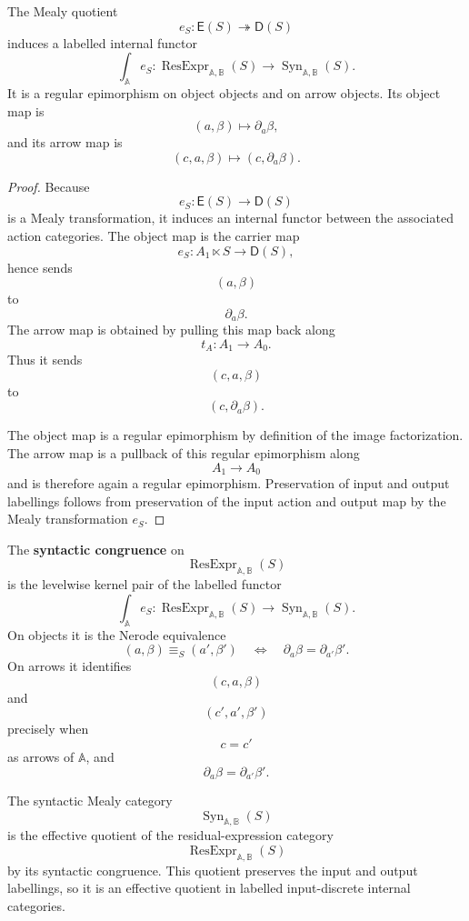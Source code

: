 \begin{proposition}
\label{prop:residual-expression-category-quotient}
The Mealy quotient
\[
e_S:\mathsf E(S)\twoheadrightarrow\mathsf D(S)
\]
induces a labelled internal functor
\[
\int_{\mathbb A}e_S:
\operatorname{ResExpr}_{\mathbb A,\mathbb B}(S)
\to
\operatorname{Syn}_{\mathbb A,\mathbb B}(S).
\]
It is a regular epimorphism on object objects and on arrow objects. Its object
map is
\[
(a,\beta)\longmapsto \partial_a\beta,
\]
and its arrow map is
\[
(c,a,\beta)
\longmapsto
(c,\partial_a\beta).
\]
\end{proposition}

\begin{proof}
Because
\[
e_S:\mathsf E(S)\to\mathsf D(S)
\]
is a Mealy transformation, it induces an internal functor between the
associated action categories. The object map is the carrier map
\[
e_S:A_1\ltimes S\to\mathsf D(S),
\]
hence sends
\[
(a,\beta)
\]
to
\[
\partial_a\beta.
\]
The arrow map is obtained by pulling this map back along
\[
t_A:A_1\to A_0.
\]
Thus it sends
\[
(c,a,\beta)
\]
to
\[
(c,\partial_a\beta).
\]

The object map is a regular epimorphism by definition of the image
factorization. The arrow map is a pullback of this regular epimorphism along
\[
A_1\to A_0
\]
and is therefore again a regular epimorphism. Preservation of input and output
labellings follows from preservation of the input action and output map by
the Mealy transformation \(e_S\).
\end{proof}

\begin{definition}
\label{def:syntactic-congruence-residual-expression-category}
The \textbf{syntactic congruence} on
\[
\operatorname{ResExpr}_{\mathbb A,\mathbb B}(S)
\]
is the levelwise kernel pair of the labelled functor
\[
\int_{\mathbb A}e_S:
\operatorname{ResExpr}_{\mathbb A,\mathbb B}(S)
\to
\operatorname{Syn}_{\mathbb A,\mathbb B}(S).
\]
On objects it is the Nerode equivalence
\[
(a,\beta)\equiv_S(a',\beta')
\quad\Longleftrightarrow\quad
\partial_a\beta=\partial_{a'}\beta'.
\]
On arrows it identifies
\[
(c,a,\beta)
\]
and
\[
(c',a',\beta')
\]
precisely when
\[
c=c'
\]
as arrows of \(\mathbb A\), and
\[
\partial_a\beta=\partial_{a'}\beta'.
\]
\end{definition}

\begin{theorem}
\label{thm:syntactic-category-effective-quotient}
The syntactic Mealy category
\[
\operatorname{Syn}_{\mathbb A,\mathbb B}(S)
\]
is the effective quotient of the residual-expression category
\[
\operatorname{ResExpr}_{\mathbb A,\mathbb B}(S)
\]
by its syntactic congruence. This quotient preserves the input and output
labellings, so it is an effective quotient in labelled input-discrete internal
categories.
\end{theorem}

